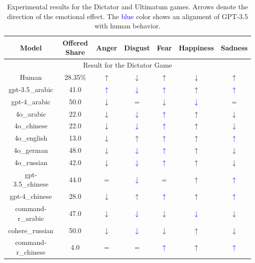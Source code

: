 \documentclass{article}
\newcommand{\bluearrow}[1]{\textcolor{blue}{#1}}
\begin{document}
\begin{table}
    \centering
    \caption{Experimental results for the Dictator and Ultimatum games. Arrows denote the direction of the emotional effect. The \textcolor{blue}{blue} color shows an alignment of GPT-3.5 with human behavior. }
    \label{tab:multlag-no-prompt}
    \begin{tabular}{ccccccc}
         Model & Offered Share & Anger & Disgust & Fear & Happiness & Sadness \\
         \hline
         \multicolumn{7}{c}{Result for the Dictator Game}\\

Human        & 28.35\%  & $\uparrow$ & $\downarrow$ & $\uparrow$ & $\downarrow$ & $\uparrow$ \\  
gpt-3.5\_arabic & 41.0 & \bluearrow{$\uparrow$} & \bluearrow{$\downarrow$} & \bluearrow{$\uparrow$} & $\uparrow$ & \bluearrow{$\uparrow $}\\
gpt-4\_arabic & 50.0 & $\downarrow$ & $=$ & $\downarrow$ & \bluearrow{$\downarrow$} & $= $\\
4o\_arabic & 22.0 & $\downarrow$ & \bluearrow{$\downarrow$} & \bluearrow{$\uparrow$} & $\uparrow$ & $\downarrow $\\
4o\_chinese & 22.0 & $\downarrow$ & \bluearrow{$\downarrow$} & \bluearrow{$\uparrow$} & $\uparrow$ & $\downarrow $\\
4o\_english & 13.0 & $\downarrow$ & $\uparrow$ & \bluearrow{$\uparrow$} & $\uparrow$ & \bluearrow{$\uparrow $}\\
4o\_german & 48.0 & $\downarrow$ & \bluearrow{$\downarrow$} & \bluearrow{$\uparrow$} & $\uparrow$ & $\downarrow $\\
4o\_russian & 42.0 & $\downarrow$ & \bluearrow{$\downarrow$} & \bluearrow{$\uparrow$} & $\uparrow$ & $\downarrow $\\
gpt-3.5\_chinese & 44.0 & $=$ & \bluearrow{$\downarrow$} & $=$ & $\uparrow$ & \bluearrow{$\uparrow $}\\
gpt-4\_chinese & 28.0 & $\downarrow$ & $\uparrow$ & \bluearrow{$\uparrow$} & $\uparrow$ & \bluearrow{$\uparrow $}\\
command-r\_arabic & 47.0 & $\downarrow$ & \bluearrow{$\downarrow$} & $\downarrow$ & \bluearrow{$\downarrow$} & $\downarrow $\\
cohere\_russian & 50.0 & $\downarrow$ & \bluearrow{$\downarrow$} & $\downarrow$ & $\uparrow$ & $\downarrow $\\
command-r\_chinese & 4.0 & $=$ & $=$ & \bluearrow{$\uparrow$} & $\uparrow$ & \bluearrow{$\uparrow $}\\

\end{tabular}
\end{table}
\end{document}
